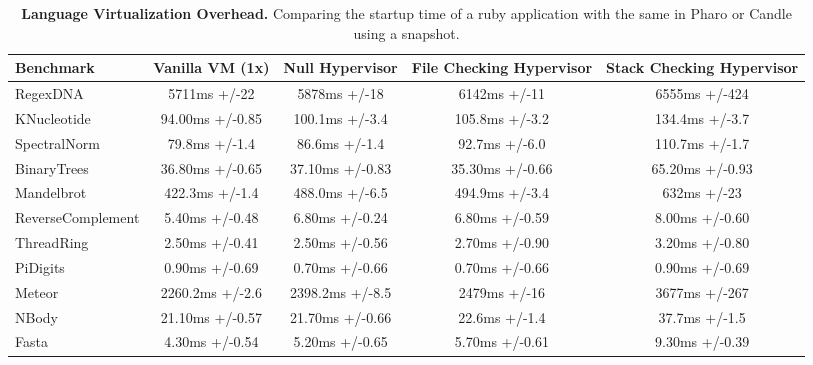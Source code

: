 \begin{landscape}
 \begin{table*}[p]
 \small
 	\centering
 	\begin{tabular}{|l|c|c|c|c|}
			\hline
			\textbf{Benchmark}
 			& \textbf{Vanilla VM (1x)}
			& \textbf{Null Hypervisor}
			& \textbf{File Checking Hypervisor}
			& \textbf{Stack Checking Hypervisor}\\
		\hline
		RegexDNA & 5711ms +/-22 & 5878ms +/-18 & 6142ms +/-11 & 6555ms +/-424 \\\hline
		KNucleotide & 94.00ms +/-0.85 & 100.1ms +/-3.4 & 105.8ms +/-3.2 & 134.4ms +/-3.7 \\\hline
		SpectralNorm & 79.8ms +/-1.4 & 86.6ms +/-1.4 & 92.7ms +/-6.0 & 110.7ms +/-1.7 \\\hline
		BinaryTrees & 36.80ms +/-0.65 & 37.10ms +/-0.83 & 35.30ms +/-0.66 & 65.20ms +/-0.93 \\\hline
		Mandelbrot & 422.3ms +/-1.4 & 488.0ms +/-6.5 & 494.9ms +/-3.4 & 632ms +/-23 \\\hline
		ReverseComplement & 5.40ms +/-0.48 & 6.80ms +/-0.24 & 6.80ms +/-0.59 & 8.00ms +/-0.60 \\\hline
		ThreadRing & 2.50ms +/-0.41 & 2.50ms +/-0.56 & 2.70ms +/-0.90 & 3.20ms +/-0.80 \\\hline
		PiDigits & 0.90ms +/-0.69 & 0.70ms +/-0.66 & 0.70ms +/-0.66 & 0.90ms +/-0.69 \\\hline
		Meteor & 2260.2ms +/-2.6 & 2398.2ms +/-8.5 & 2479ms +/-16 & 3677ms +/-267 \\\hline
		NBody & 21.10ms +/-0.57 & 21.70ms +/-0.66 & 22.6ms +/-1.4 & 37.7ms +/-1.5 \\\hline
		Fasta & 4.30ms +/-0.54 & 5.20ms +/-0.65 & 5.70ms +/-0.61 & 9.30ms +/-0.39 \\\hline
 	\end{tabular}
	\vspace*{0.2cm}
 	\caption{\small\textbf{Language Virtualization Overhead.} Comparing the startup time of a ruby application with the same in Pharo or Candle using a snapshot.\label{tb:benchmarks}}
 \end{table*}
\end{landscape}
